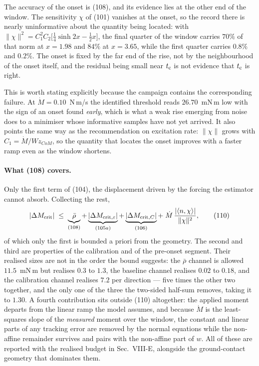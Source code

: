 \documentclass[10pt]{article}
\newcommand{\Wz}{W\!z_{CoM}}
\newcommand{\tc}{t_{\rm c}}
\newcommand{\rbar}{\bar\rho}
\begin{document}
The accuracy of the onset is (108), and its evidence lies at the other
end of the window. The sensitivity $\chi$ of (101) vanishes at the
onset, so the record there is nearly uninformative about the quantity
being located: with $\|\chi\|^2 = C_1^2C_2\bigl[\tfrac14\sinh2x -
\tfrac12 x\bigr]$, the final quarter of the window carries $70\%$ of
that norm at $x = 1.98$ and $84\%$ at $x = 3.65$, while the first
quarter carries $0.8\%$ and $0.2\%$. The onset is fixed by the far end
of the rise, not by the neighbourhood of the onset itself, and the
residual being small near $\tc$ is not evidence that $\tc$ is right.

This is worth stating explicitly because the campaign contains the
corresponding failure. At $\dot M = 0.10$~N\,m/s the identified threshold
reads $26.70$~mN\,m low with the sign of an onset found \emph{early},
which is what a weak rise emerging from noise does to a minimiser
whose informative samples have not yet arrived. It also points the same
way as the recommendation on excitation rate: $\|\chi\|$ grows with
$C_1 = \dot M/\Wz$, so the quantity that locates the onset improves with
a faster ramp even as the window shortens.

\paragraph{What (108) covers.}
Only the first term of (104), the displacement driven by the forcing the
estimator cannot absorb. Collecting the rest,
\begin{equation}
  |\Delta M_{\rm crit}| \;\le\;
  \underbrace{\rbar}_{(108)} +
  \underbrace{|\Delta M_{{\rm crit},\varepsilon}|}_{(105a)} +
  \underbrace{|\Delta M_{{\rm crit},C}|}_{(106)} +
  \;\dot M\,\frac{|\langle n,\chi\rangle|}{\|\chi\|^2},
  \tag{110}
\end{equation}
of which only the first is bounded a priori from the geometry. The
second and third are properties of the calibration and of the pre-onset
segment. Their realised sizes are not in the order the bound suggests:
the $\rbar$ channel is allowed $11.5$~mN\,m but realises $0.3$ to
$1.3$, the baseline channel realises $0.02$ to $0.18$, and the
calibration channel realises $7.2$ per direction --- five times the
other two together, and the only one of the three the two-sided
half-sum removes, taking it to $1.30$. A fourth contribution sits
outside (110) altogether: the applied moment departs from the linear
ramp the model assumes, and because $\dot M$ is the least-squares slope
of the \emph{measured} moment over the window, the constant and linear
parts of any tracking error are removed by the normal equations while
the non-affine remainder survives and pairs with the non-affine part of
$w$. All of these are reported with the realised budget in
Sec.~VIII-E, alongside the ground-contact geometry that dominates them.
\end{document}
